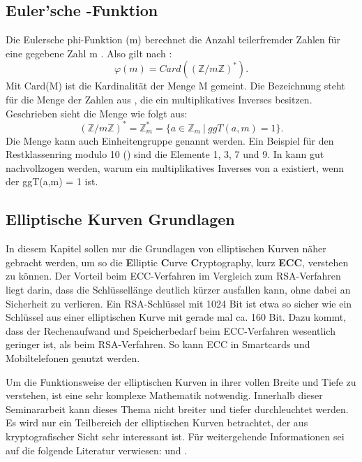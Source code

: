 		\subsection{Euler’sche \myPhi -Funktion}
			Die Eulersche phi-Funktion \myPhi(m) berechnet die Anzahl teilerfremder Zahlen für eine gegebene Zahl m . Also gilt nach \cite{Algorithmische:Zahlentheorie}: 
			\begin{displaymath}
				\varphi(m) = Card((\mathbb{Z}/m\mathbb{Z})^*).
			\end{displaymath}			
			Mit Card(M) ist die Kardinalität der Menge M gemeint. Die Bezeichnung  steht für die Menge der Zahlen aus , die ein multiplikatives Inverses besitzen. Geschrieben sieht die Menge wie folgt aus:
			\begin{displaymath}
				(\mathbb{Z}/m\mathbb{Z})^* = \mathbb{Z}_m^* = \{a \in \mathbb{Z}_m ~|~ggT(a,m) = 1\}.
			\end{displaymath}
			Die Menge  kann auch Einheitengruppe genannt werden. Ein Beispiel für den Restklassenring modulo 10 () sind die Elemente 1, 3, 7 und 9. In \cite{Mathematik:fuer:Informatiker} kann gut nachvollzogen werden, warum ein multiplikatives Inverses von a existiert, wenn der ggT(a,m) = 1 ist.
		
	\subsection{Elliptische Kurven Grundlagen}\label{Elliptischen Kurven Grundlagen}
		In diesem Kapitel sollen nur die Grundlagen von elliptischen Kurven näher gebracht werden, um so die \textbf{E}lliptic \textbf{C}urve \textbf{C}ryptography, kurz \textbf{ECC}, verstehen zu können. Der Vorteil beim ECC-Verfahren im Vergleich zum RSA-Verfahren liegt darin, dass die Schlüssellänge deutlich kürzer ausfallen kann, ohne dabei an Sicherheit zu verlieren. Ein RSA-Schlüssel mit 1024 Bit ist etwa so sicher wie ein Schlüssel aus einer elliptischen Kurve mit gerade mal ca. 160 Bit. Dazu kommt, dass der Rechenaufwand und Speicherbedarf beim ECC-Verfahren wesentlich geringer ist, als beim RSA-Verfahren. So kann ECC in Smartcards und Mobiltelefonen genutzt werden.\cite{Information:und:Kommunikation}
		
		Um die Funktionsweise der elliptischen Kurven in ihrer vollen Breite und Tiefe zu verstehen, ist eine sehr komplexe Mathematik notwendig. Innerhalb dieser Seminararbeit kann dieses Thema nicht breiter und tiefer durchleuchtet werden. Es wird nur ein Teilbereich der elliptischen Kurven betrachtet, der aus kryptografischer Sicht sehr interessant ist. Für weitergehende Informationen sei auf die folgende Literatur verwiesen: \cite{Information:und:Kommunikation} und \cite{Kryptographie:und:IT-Sicherheit}.
		
